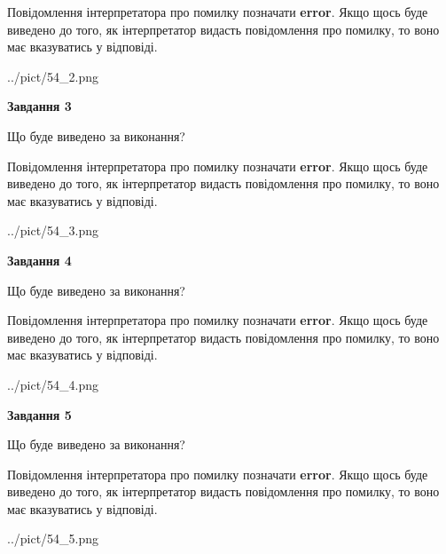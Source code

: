 \documentclass[12pt, ukrainian]{article}
\begin{document}
{\begin {large}
Повідомлення інтерпретатора про помилку позначати \textbf{error}.
Якщо щось буде виведено до того, як інтерпретатор видасть повідомлення про помилку, 
то воно має вказуватись у відповіді. \par


\begin{center}
	{../pict/54_2.png}
\end{center}
\newpage

{\begin {center}\textbf{Завдання 3}\end {center}}\par
Що буде виведено за виконання?

Повідомлення інтерпретатора про помилку позначати \textbf{error}.
Якщо щось буде виведено до того, як інтерпретатор видасть повідомлення про помилку, 
то воно має вказуватись у відповіді. \par


\begin{center}
	{../pict/54_3.png}
\end{center}
\newpage

{\begin {center}\textbf{Завдання 4}\end {center}}\par
Що буде виведено за виконання?

Повідомлення інтерпретатора про помилку позначати \textbf{error}.
Якщо щось буде виведено до того, як інтерпретатор видасть повідомлення про помилку, 
то воно має вказуватись у відповіді. \par


\begin{center}
	{../pict/54_4.png}
\end{center}
\newpage

{\begin {center}\textbf{Завдання 5}\end {center}}\par
Що буде виведено за виконання?

Повідомлення інтерпретатора про помилку позначати \textbf{error}.
Якщо щось буде виведено до того, як інтерпретатор видасть повідомлення про помилку, 
то воно має вказуватись у відповіді. \par


\begin{center}
	{../pict/54_5.png}
\end{center}
\newpage


\end{large}}
\end{document}
